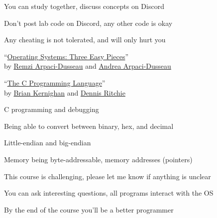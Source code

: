 \begin{slide}
  

  You can study together, discuss concepts on Discord
  \medskip

  Don't post lab code on Discord, any other code is okay
  \medskip

  Any cheating is not tolerated, and will only hurt you
\end{slide}

\begin{slide}
  

    ``\href{https://pages.cs.wisc.edu/~remzi/OSTEP/}
           {Operating Systems: Three Easy Pieces}'' \\
    by \href{http://www.cs.wisc.edu/~remzi/}{Remzi Arpaci-Dusseau}
    and \href{http://www.cs.wisc.edu/~dusseau/}{Andrea Arpaci-Dusseau}
    \bigskip

    ``\href{https://en.wikipedia.org/wiki/The_C_Programming_Language}
           {The C Programming Language}'' \\
    by \href{https://en.wikipedia.org/wiki/Brian_Kernighan}{Brian Kernighan}
    and \href{https://en.wikipedia.org/wiki/Dennis_Ritchie}{Dennis Ritchie}
\end{slide}

\begin{slide}
  

  C programming and debugging
  \medskip

  Being able to convert between binary, hex, and decimal
  \medskip

  Little-endian and big-endian
  \medskip

  Memory being byte-addressable, memory addresses (pointers)
\end{slide}

\begin{slide}
  

  This course is challenging, please let me know if anything is unclear
  \medskip

  You can ask interesting questions, all programs interact with the OS
  \medskip

  By the end of the course you'll be a better programmer
\end{slide}

